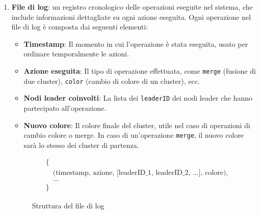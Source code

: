 \documentclass[12pt, a4paper]{report}
\begin{document}
\begin{enumerate}
    \item \textbf{File di log}: un registro cronologico delle operazioni eseguite nel sistema, che include informazioni dettagliate su ogni azione eseguita. Ogni operazione nel file di log \`e composta dai seguenti elementi:
    \begin{itemize}
        \item \textbf{Timestamp}: Il momento in cui l'operazione \`e stata eseguita, usato per ordinare temporalmente le azioni.
        \item \textbf{Azione eseguita}: Il tipo di operazione effettuata, come \texttt{merge} (fusione di due cluster), \texttt{color} (cambio di colore di un cluster), ecc.
        \item \textbf{Nodi leader coinvolti}: La lista dei \texttt{leaderID} dei nodi leader che hanno partecipato all'operazione.
        \item \textbf{Nuovo colore}: Il colore finale del cluster, utile nel caso di operazioni di cambio colore o merge. In caso di un'operazione \texttt{merge}, il nuovo colore sar\`a lo stesso dei cluster di partenza.
    \end{itemize}
    \vspace{-20pt}
    \begin{figure}[H]
        \begin{align*}
            &\{ \\
            &\quad \text{(timestamp, azione, [leaderID\_1, leaderID\_2, \ldots], colore)},\\
            &\quad \ldots\\
            &\}
        \end{align*}
        \vspace{-20pt}
        \caption{Struttura del file di log}
    \end{figure}


\end{enumerate}
\end{document}
